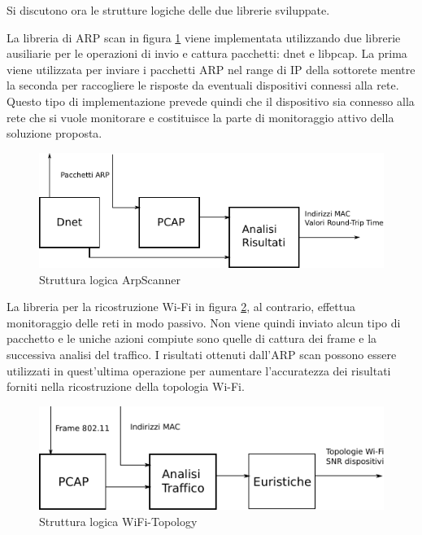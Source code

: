 Si discutono ora le strutture logiche delle due librerie sviluppate.

La libreria di ARP scan in figura \ref{fig:ArpScanner} viene implementata utilizzando due librerie ausiliarie per le operazioni di invio e cattura pacchetti: dnet e libpcap.
La prima viene utilizzata per inviare i pacchetti ARP nel range di IP della sottorete mentre la seconda per raccogliere le risposte da eventuali dispositivi connessi alla rete.
Questo tipo di implementazione prevede quindi che il dispositivo sia connesso alla rete che si vuole monitorare e costituisce la parte di monitoraggio attivo della soluzione proposta.

\begin{figure}[!htb]
	\centering
	\includegraphics{images/drawingarpscanner.pdf}%
	\caption{Struttura logica ArpScanner}
	\label{fig:ArpScanner}
\end{figure}


La libreria per la ricostruzione Wi-Fi in figura \ref{fig:WiFi-Topology}, al contrario, effettua monitoraggio delle reti in modo passivo.
Non viene quindi inviato alcun tipo di pacchetto e le uniche azioni compiute sono quelle di cattura dei frame e la successiva analisi del traffico.
I risultati ottenuti dall'ARP scan possono essere utilizzati in quest'ultima operazione per aumentare l'accuratezza dei risultati forniti nella ricostruzione della topologia Wi-Fi.

\begin{figure}[!htb]
	\centering
	\includegraphics{images/drawingwifitopology.pdf}%
	\caption{Struttura logica WiFi-Topology}
	\label{fig:WiFi-Topology}
\end{figure}


